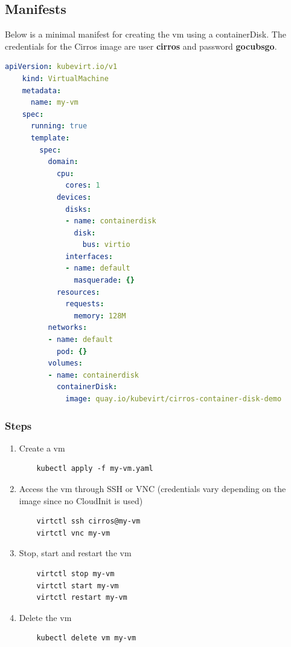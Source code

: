 \documentclass{kththesis}
\begin{document}
\begin{enumerate}
\subsection*{Manifests}
Below is a minimal manifest for creating the \Gls{vm} using a containerDisk. The credentials for the Cirros image are user \textbf{cirros} and password \textbf{gocubsgo}.
\begin{lstlisting}[language=yaml]
    apiVersion: kubevirt.io/v1
    kind: VirtualMachine
    metadata:
      name: my-vm
    spec:
      running: true
      template:
        spec:
          domain:
            cpu:
              cores: 1
            devices:
              disks:
              - name: containerdisk
                disk:
                  bus: virtio
              interfaces:
              - name: default
                masquerade: {}
            resources:
              requests:
                memory: 128M
          networks:
          - name: default
            pod: {}
          volumes:
          - name: containerdisk
            containerDisk:
              image: quay.io/kubevirt/cirros-container-disk-demo
\end{lstlisting}

\subsubsection*{Steps}
\begin{enumerate}
    \item Create a \Gls{vm}
\begin{lstlisting}
    kubectl apply -f my-vm.yaml
\end{lstlisting}
    \item Access the \Gls{vm} through SSH or VNC (credentials vary depending on the image since no CloudInit is used)
\begin{lstlisting}
    virtctl ssh cirros@my-vm
    virtctl vnc my-vm
\end{lstlisting}
    \item Stop, start and restart the \Gls{vm}
\begin{lstlisting}
    virtctl stop my-vm
    virtctl start my-vm
    virtctl restart my-vm
\end{lstlisting}
    \item Delete the \Gls{vm}
\begin{lstlisting}
    kubectl delete vm my-vm
\end{lstlisting}
\end{enumerate}


\end{enumerate}
\end{document}
